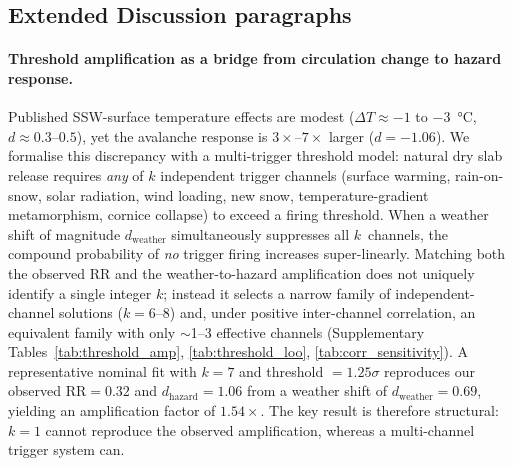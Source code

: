 \documentclass[11pt,letterpaper]{article}
\begin{document}
\subsection*{Extended Discussion paragraphs}

\paragraph{Threshold amplification as a bridge from circulation change to hazard response.} Published SSW-surface temperature effects are modest ($\Delta T \approx -1$ to $-3$~°C, $d \approx 0.3$--$0.5$)\cite{Kolstad2010,Butler2017}, yet the avalanche response is $3\times$--$7\times$ larger ($d = -1.06$). We formalise this discrepancy with a multi-trigger threshold model: natural dry slab release requires \emph{any} of $k$ independent trigger channels (surface warming, rain-on-snow, solar radiation, wind loading, new snow, temperature-gradient metamorphism, cornice collapse) to exceed a firing threshold. When a weather shift of magnitude $d_{\mathrm{weather}}$ simultaneously suppresses all $k$~channels, the compound probability of \emph{no} trigger firing increases super-linearly. Matching both the observed RR and the weather-to-hazard amplification does not uniquely identify a single integer $k$; instead it selects a narrow family of independent-channel solutions ($k = 6$--$8$) and, under positive inter-channel correlation, an equivalent family with only $\sim$1--3 effective channels (Supplementary Tables~\ref{tab:threshold_amp}, \ref{tab:threshold_loo}, \ref{tab:corr_sensitivity}). A representative nominal fit with $k = 7$ and threshold $= 1.25\sigma$ reproduces our observed $\mathrm{RR} = 0.32$ and $d_{\mathrm{hazard}} = 1.06$ from a weather shift of $d_{\mathrm{weather}} = 0.69$, yielding an amplification factor of $1.54\times$. The key result is therefore structural: $k = 1$ cannot reproduce the observed amplification, whereas a multi-channel trigger system can.
\end{document}
